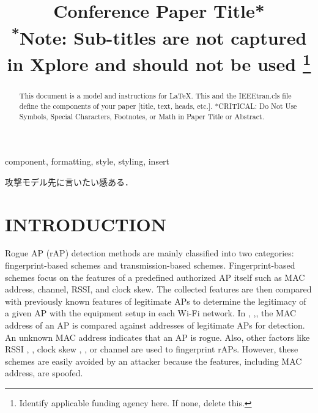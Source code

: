 \documentclass[conference]{IEEEtran}
\begin{document}
\title{Conference Paper Title*\\
{\footnotesize \textsuperscript{*}Note: Sub-titles are not captured in Xplore and
should not be used}
\thanks{Identify applicable funding agency here. If none, delete this.}
}

\author{
\and
{}
\and
{}
\and

}

\maketitle

\begin{abstract}
This document is a model and instructions for \LaTeX.
This and the IEEEtran.cls file define the components of your paper [title, text, heads, etc.]. *CRITICAL: Do Not Use Symbols, Special Characters, Footnotes, 
or Math in Paper Title or Abstract.
\end{abstract}

\begin{IEEEkeywords}
component, formatting, style, styling, insert
\end{IEEEkeywords}
 攻撃モデル先に言いたい感ある．
\section{INTRODUCTION}

Rogue AP (rAP) detection methods are mainly classified into two categories: fingerprint-based schemes and transmission-based schemes.
Fingerprint-based schemes focus on the features of a predefined authorized AP itself such as MAC address, channel, RSSI, and clock skew.
The collected features are then compared with previously known features of legitimate APs to determine the legitimacy of a given AP with the equipment setup in each Wi-Fi network.
In \cite{snooping1}, \cite{snooping2},\cite{snooping3}, the MAC address of an AP is compared against addresses of legitimate APs for detection.
An unknown MAC address indicates that an AP is rogue.
Also, other factors like RSSI \cite{rssi1}, \cite{rssi2}, clock skew \cite{clock1}, \cite{clock2}, or channel \cite{channel1} are used to fingerprint rAPs.
However, these schemes are easily avoided by an attacker because the features, including MAC address, are spoofed.
\end{document}
